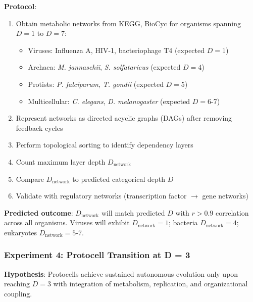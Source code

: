 \documentclass[11pt]{article}
\begin{document}
\textbf{Protocol}:
\begin{enumerate}
\item Obtain metabolic networks from KEGG, BioCyc for organisms spanning $D = 1$ to $D = 7$:
\begin{itemize}
\item Viruses: Influenza A, HIV-1, bacteriophage T4 (expected $D = 1$)
\item Archaea: \textit{M. jannaschii}, \textit{S. solfataricus} (expected $D = 4$)
\item Protists: \textit{P. falciparum}, \textit{T. gondii} (expected $D = 5$)
\item Multicellular: \textit{C. elegans}, \textit{D. melanogaster} (expected $D = 6$-7)
\end{itemize}
\item Represent networks as directed acyclic graphs (DAGs) after removing feedback cycles
\item Perform topological sorting to identify dependency layers
\item Count maximum layer depth $D_{\text{network}}$
\item Compare $D_{\text{network}}$ to predicted categorical depth $D$
\item Validate with regulatory networks (transcription factor $\to$ gene networks)
\end{enumerate}

\textbf{Predicted outcome}: $D_{\text{network}}$ will match predicted $D$ with $r > 0.9$ correlation across all organisms. Viruses will exhibit $D_{\text{network}} = 1$; bacteria $D_{\text{network}} = 4$; eukaryotes $D_{\text{network}} = 5$-7.

\subsubsection{Experiment 4: Protocell Transition at D = 3}

\textbf{Hypothesis}: Protocells achieve sustained autonomous evolution only upon reaching $D = 3$ with integration of metabolism, replication, and organizational coupling.
\end{document}
